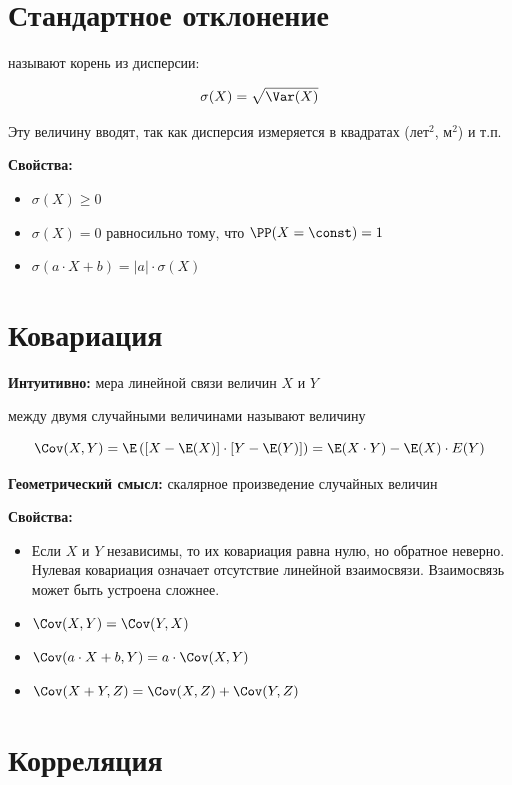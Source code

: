 \documentclass[12pt, a4paper, oneside]{article}
\begin{document}
\section{Стандартное отклонение}

 называют корень из дисперсии:

$$
\sigma(X)=\sqrt{\Var(X)}
$$

Эту величину вводят, так как дисперсия измеряется в квадратах (лет$^2$, м$^2$) и т.п.

\textbf{Свойства:}

\begin{itemize}
\item $\sigma(X) \ge 0$
\item $\sigma(X) = 0$ равносильно тому, что $\PP(X=\const)=1$
\item $\sigma(a \cdot X + b) = |a| \cdot \sigma(X)$
\end{itemize}


\section{Ковариация}

\textbf{Интуитивно:} мера линейной связи величин $X$ и $Y$

 между двумя случайными величинами называют величину

$$
\Cov(X, Y) = \E\left( [X - \E(X)] \cdot [Y - \E(Y)] \right) = \E(X \cdot Y) - \E(X) \cdot E(Y)
$$

\textbf{Геометрический смысл:} скалярное произведение случайных величин

\textbf{Свойства:}

\begin{itemize} 
\item Если $X$ и $Y$ независимы, то их ковариация равна нулю, но обратное неверно. Нулевая ковариация означает отсутствие линейной взаимосвязи. Взаимосвязь может быть устроена сложнее.
\item $\Cov(X, Y) = \Cov(Y, X)$
\item $\Cov(a \cdot X + b, Y) = a \cdot \Cov(X, Y)$
\item $\Cov(X + Y, Z) = \Cov(X, Z) + \Cov(Y, Z)$
\end{itemize}


\section{Корреляция}
\end{document}

